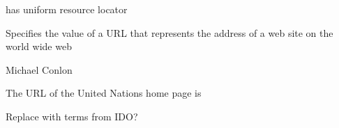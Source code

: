 \documentclass[letterpaper,10pt,english]{sphinxmanual}
\begin{document}
\begin{sphinxShadowBox}

\sphinxAtStartPar
has uniform resource locator
\end{sphinxShadowBox}

\begin{sphinxShadowBox}

\sphinxAtStartPar
{\hyperref[\detokenize{doc-OBI_0002815::doc}]{}}
\end{sphinxShadowBox}

\begin{sphinxShadowBox}

\sphinxAtStartPar
Specifies the value of a URL that represents the address of a web site on the world wide web
\end{sphinxShadowBox}

\begin{sphinxShadowBox}

\sphinxAtStartPar
Michael Conlon 
\end{sphinxShadowBox}

\begin{sphinxShadowBox}

\sphinxAtStartPar
{\hyperref[\detokenize{doc-ORG_0000053::doc}]{}}
\end{sphinxShadowBox}

\begin{sphinxShadowBox}

\sphinxAtStartPar
{}
\end{sphinxShadowBox}

\begin{sphinxShadowBox}

\sphinxAtStartPar
The URL of the United Nations home page is 
\end{sphinxShadowBox}

\begin{sphinxShadowBox}

\sphinxAtStartPar
Replace with terms from IDO?
\end{sphinxShadowBox}
\end{document}
